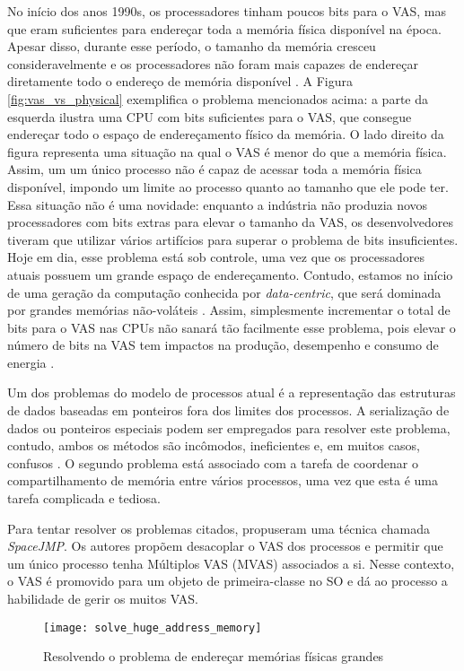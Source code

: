 No início dos anos 1990s, os processadores tinham poucos bits para o VAS, mas que eram suficientes
para endereçar toda a memória física disponível na época. Apesar disso, durante
esse período, o tamanho da memória cresceu consideravelmente e os processadores
não foram mais capazes de endereçar diretamente todo o endereço de memória disponível
\cite{crowley}. A Figura \ref{fig:vas_vs_physical} exemplifica o problema
mencionados acima: a parte da esquerda ilustra uma CPU com bits suficientes
para o VAS, que consegue endereçar todo o espaço de endereçamento
físico da memória. O lado direito da figura representa uma situação na qual o
VAS é menor do que a memória física. Assim, um um único processo não é capaz de
acessar toda a memória física disponível, impondo um limite ao processo
quanto ao tamanho que ele pode ter. Essa situação
não é uma novidade: enquanto a indústria não produzia
novos processadores com bits extras para elevar o tamanho da VAS, os
desenvolvedores tiveram que utilizar vários artifícios para superar o
problema de bits insuficientes. Hoje em dia, esse problema está sob controle,
uma vez que os processadores atuais possuem um grande espaço de endereçamento.
Contudo, estamos no início de uma geração da computação conhecida por
\emph{data-centric}, que será dominada por grandes memórias não-voláteis
\citep{outlook}. Assim, simplesmente incrementar o total de bits para o VAS nas
CPUs não sanará tão facilmente esse problema, pois elevar o número de bits na
VAS tem impactos na produção, desempenho e consumo de energia \citep{spacejmp}.

Um dos problemas do modelo de processos atual é a representação
das estruturas de dados baseadas em ponteiros fora dos
limites dos processos. A serialização de dados ou ponteiros especiais podem ser
empregados para resolver este problema, contudo, ambos os métodos são
incômodos, ineficientes e, em muitos casos, confusos \citep{spacejmp}. O segundo
problema está associado com a tarefa de coordenar o compartilhamento de memória
entre vários processos, uma vez que esta é uma tarefa complicada e tediosa.

Para tentar resolver os problemas citados, \citet{spacejmp} propuseram uma
técnica chamada \emph{SpaceJMP}. Os autores propõem desacoplar o VAS dos
processos e permitir que um único processo tenha Múltiplos VAS (MVAS)
associados a si. Nesse contexto, o VAS é promovido para um objeto de
primeira-classe no SO e dá ao processo a habilidade de gerir os muitos
VAS.

\begin{figure}[!h]
  \centering
  \texttt{[image: solve\_huge\_address\_memory]}
  \caption{Resolvendo o problema de endereçar memórias físicas grandes}
  \label{fig:large_memory}
\end{figure}

